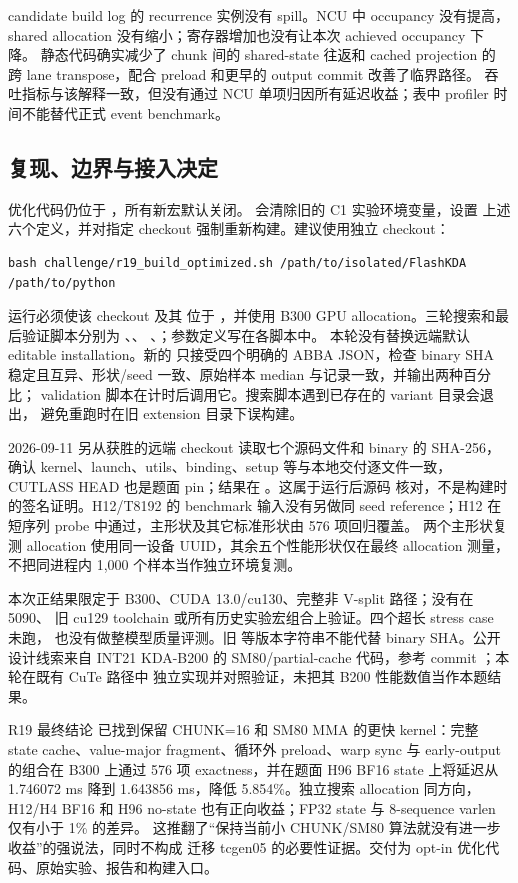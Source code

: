 candidate build log 的 recurrence 实例没有 spill。NCU 中 occupancy 没有提高，
shared allocation 没有缩小；寄存器增加也没有让本次 achieved occupancy 下降。
静态代码确实减少了 chunk 间的 shared-state 往返和 cached projection 的
跨 lane transpose，配合 preload 和更早的 output commit 改善了临界路径。
吞吐指标与该解释一致，但没有通过 NCU 单项归因所有延迟收益；表中 profiler
时间不能替代正式 event benchmark。

\subsection{复现、边界与接入决定}

优化代码仍位于 ，所有新宏默认关闭。
 会清除旧的 C1 实验环境变量，设置
上述六个定义，并对指定 checkout 强制重新构建。建议使用独立 checkout：
\begin{lstlisting}
bash challenge/r19_build_optimized.sh /path/to/isolated/FlashKDA /path/to/python
\end{lstlisting}
运行必须使该 checkout 及其  位于 ，并使用
B300 GPU allocation。三轮搜索和最后验证脚本分别为
、、
、；参数定义写在各脚本中。
本轮没有替换远端默认 editable installation。新的
 只接受四个明确的 ABBA JSON，检查 binary SHA
稳定且互异、形状/seed 一致、原始样本 median 与记录一致，并输出两种百分比；
validation 脚本在计时后调用它。搜索脚本遇到已存在的 variant 目录会退出，
避免重跑时在旧 extension 目录下误构建。

2026-09-11 另从获胜的远端 checkout 读取七个源码文件和 binary 的 SHA-256，
确认 kernel、launch、utils、binding、setup 等与本地交付逐文件一致，CUTLASS
HEAD 也是题面 pin；结果在 。这属于运行后源码
核对，不是构建时的签名证明。H12/T8192 的 benchmark 输入没有另做同 seed
reference；H12 在短序列 probe 中通过，主形状及其它标准形状由 576 项回归覆盖。
两个主形状复测 allocation 使用同一设备 UUID，其余五个性能形状仅在最终
allocation 测量，不把同进程内 1,000 个样本当作独立环境复测。

本次正结果限定于 B300、CUDA 13.0/cu130、完整非 V-split 路径；没有在 5090、
旧 cu129 toolchain 或所有历史实验宏组合上验证。四个超长 stress case 未跑，
也没有做整模型质量评测。旧  等版本字符串不能代替 binary
SHA。公开设计线索来自 INT21 KDA-B200 的 SM80/partial-cache 代码，参考 commit
；本轮在既有 CuTe 路径中
独立实现并对照验证，未把其 B200 性能数值当作本题结果。

\begin{record}{R19 最终结论}
已找到保留 CHUNK=16 和 SM80 MMA 的更快 kernel：完整 state cache、value-major
fragment、循环外 preload、warp sync 与 early-output 的组合在 B300 上通过
576 项 exactness，并在题面 H96 BF16 state 上将延迟从 1.746072 ms 降到
1.643856 ms，降低 5.854\%。独立搜索 allocation 同方向，H12/H4 BF16 和 H96
no-state 也有正向收益；FP32 state 与 8-sequence varlen 仅有小于 1\% 的差异。
这推翻了“保持当前小 CHUNK/SM80 算法就没有进一步收益”的强说法，同时不构成
迁移 tcgen05 的必要性证据。交付为 opt-in 优化代码、原始实验、报告和构建入口。
\end{record}
